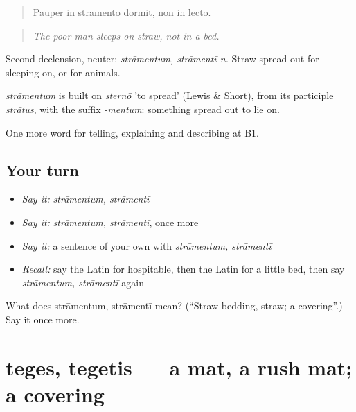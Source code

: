 \begin{quote}
Pauper in strāmentō dormit, nōn in lectō.
\end{quote}

\begin{quote}
\emph{The poor man sleeps on straw, not in a bed.}
\end{quote}

Second declension, neuter: \emph{strāmentum, strāmentī n.} Straw spread out for sleeping on, or for animals.

\begin{cousinweb}
\emph{strāmentum} is built on \emph{sternō} 'to spread' (Lewis \& Short), from its participle \emph{strātus}, with the suffix \emph{-mentum}: something spread out to lie on.
\end{cousinweb}

\begin{grammarlens}[title={What you've built}]
One more word for telling, explaining and describing at B1.
\end{grammarlens}

\subsection*{Your turn}
\begin{itemize}
\raggedright
  \item \emph{Say it:} \emph{strāmentum, strāmentī}
  \item \emph{Say it:} \emph{strāmentum, strāmentī}, once more
  \item \emph{Say it:} a sentence of your own with \emph{strāmentum, strāmentī}
  \item \emph{Recall:} say the Latin for hospitable, then the Latin for a little bed, then say \emph{strāmentum, strāmentī} again
\end{itemize}

\begin{tcolorbox}[breakable,colback=teal!4,colframe=teal!35!black,title={Before you move on}]
What does strāmentum, strāmentī mean? (\textquotedblleft{}Straw bedding, straw; a covering\textquotedblright{}.) Say it once more.
\end{tcolorbox}
\section[teges, tegetis]{teges, tegetis — a mat, a rush mat; a covering}

\label{lesson:LA-C446-teges}



